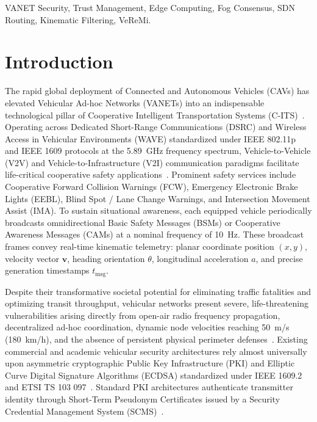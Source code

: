 \documentclass[conference]{IEEEtran}
\begin{document}
\begin{IEEEkeywords}
VANET Security, Trust Management, Edge Computing, Fog Consensus, SDN Routing, Kinematic Filtering, VeReMi.
\end{IEEEkeywords}


\section{Introduction}

The rapid global deployment of Connected and Autonomous Vehicles (CAVs) has elevated Vehicular Ad-hoc Networks (VANETs) into an indispensable technological pillar of Cooperative Intelligent Transportation Systems (C-ITS)~\cite{raya}. Operating across Dedicated Short-Range Communications (DSRC) and Wireless Access in Vehicular Environments (WAVE) standardized under IEEE 802.11p and IEEE 1609 protocols at the 5.89~GHz frequency spectrum, Vehicle-to-Vehicle (V2V) and Vehicle-to-Infrastructure (V2I) communication paradigms facilitate life-critical cooperative safety applications~\cite{vanetsecurity}. Prominent safety services include Cooperative Forward Collision Warnings (FCW), Emergency Electronic Brake Lights (EEBL), Blind Spot / Lane Change Warnings, and Intersection Movement Assist (IMA). To sustain situational awareness, each equipped vehicle periodically broadcasts omnidirectional Basic Safety Messages (BSMs) or Cooperative Awareness Messages (CAMs) at a nominal frequency of 10~Hz. These broadcast frames convey real-time kinematic telemetry: planar coordinate position $(x, y)$, velocity vector $\mathbf{v}$, heading orientation $\theta$, longitudinal acceleration $a$, and precise generation timestamps $t_{\text{msg}}$.

Despite their transformative societal potential for eliminating traffic fatalities and optimizing transit throughput, vehicular networks present severe, life-threatening vulnerabilities arising directly from open-air radio frequency propagation, decentralized ad-hoc coordination, dynamic node velocities reaching 50~m/s (180~km/h), and the absence of persistent physical perimeter defenses~\cite{trustsurvey, kargl2008secure}. Existing commercial and academic vehicular security architectures rely almost universally upon asymmetric cryptographic Public Key Infrastructure (PKI) and Elliptic Curve Digital Signature Algorithms (ECDSA) standardized under IEEE 1609.2~\cite{ieee16092} and ETSI TS 103 097~\cite{etsi103097}. Standard PKI architectures authenticate transmitter identity through Short-Term Pseudonym Certificates issued by a Security Credential Management System (SCMS)~\cite{whyte2013security}. 
\end{document}
